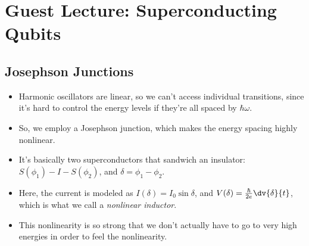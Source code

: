 \section{Guest Lecture: Superconducting Qubits}
\subsection{Josephson Junctions}
\begin{itemize}
	\item Harmonic oscillators are linear, so we can't access individual transitions, since it's hard to control 
		the energy levels if they're all spaced by \( \hbar \omega \). 
	\item So, we employ a Josephson junction, which makes the energy spacing highly nonlinear. 
	\item It's basically two superconductors that sandwich an insulator:
		\( S(\phi_1) - I - S(\phi_2) \), and \( \delta = \phi_1 - \phi_2 \). 
	\item Here, the current is modeled as \( I(\delta) = I_0 \sin \delta \), and \( V(\delta) = \frac{\hbar}{2e}
		\dv{\delta}{t}\), which is what we call a \textit{nonlinear inductor}.  
	\item This nonlinearity is so strong that we don't actually have to go to very high energies in order to 
		feel the nonlinearity. 
\end{itemize}
